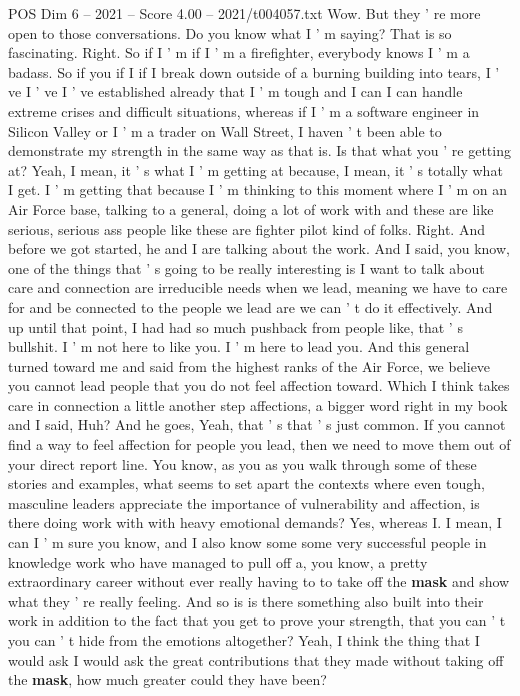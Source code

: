 \begin{textsample}{POS Dim 6 – 2021 – Score 4.00 – 2021/t004057.txt}
Wow.
But they ' re more open to those conversations.
Do you know what I ' m saying?
That is so fascinating.
Right.
So if I ' m if I ' m a firefighter, everybody knows I ' m a badass.
So if you if I if I break down outside of a burning building into tears, I ' ve I ' ve I ' ve established already that I ' m tough and I can I can handle extreme crises and difficult situations, whereas if I ' m a software engineer in Silicon Valley or I ' m a trader on Wall Street, I haven ' t been able to demonstrate my strength in the same way as that is.
Is that what you ' re getting at?
Yeah, I mean, it ' s what I ' m getting at because, I mean, it ' s totally what I get.
I ' m getting that because I ' m thinking to this moment where I ' m on an Air Force base, talking to a general, doing a lot of work with and these are like serious, serious ass people like these are fighter pilot kind of folks.
Right.
And before we got started, he and I are talking about the work.
And I said, you know, one of the things that ' s going to be really interesting is I want to talk about care and connection are irreducible needs when we lead, meaning we have to care for and be connected to the people we lead are we can ' t do it effectively.
And up until that point, I had had so much pushback from people like, that ' s bullshit.
I ' m not here to like you.
I ' m here to lead you.
And this general turned toward me and said from the highest ranks of the Air Force, we believe you cannot lead people that you do not feel affection toward.
Which I think takes care in connection a little another step affections, a bigger word right in my book and I said, Huh?
And he goes, Yeah, that ' s that ' s just common.
If you cannot find a way to feel affection for people you lead, then we need to move them out of your direct report line.
You know, as you as you walk through some of these stories and examples, what seems to set apart the contexts where even tough, masculine leaders appreciate the importance of vulnerability and affection, is there doing work with with heavy emotional demands?
Yes, whereas I.
I mean, I can I ' m sure you know, and I also know some some very successful people in knowledge work who have managed to pull off a, you know, a pretty extraordinary career without ever really having to to take off the \textbf{mask} and show what they ' re really feeling.
And so is is there something also built into their work in addition to the fact that you get to prove your strength, that you can ' t you can ' t hide from the emotions altogether?
Yeah, I think the thing that I would ask I would ask the great contributions that they made without taking off the \textbf{mask}, how much greater could they have been?

\end{textsample}
